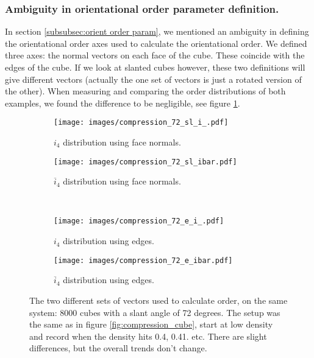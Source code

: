\documentclass[thesis]{subfiles}
\begin{document}
\subsubsection{Ambiguity in orientational order parameter definition.}\label{subsubsec:orientation vectors}
In section \ref{subsubsec:orient order param}, we mentioned an ambiguity in defining the orientational order axes used to calculate the orientational order. We defined three axes: the normal vectors on each face of the cube. These coincide with the edges of the cube. If we look at slanted cubes however, these two definitions will give different vectors (actually the one set of vectors is just a rotated version of the other). When measuring and comparing the order distributions of both examples, we found the difference to be negligible, see figure \ref{fig:orient_comparison}.

\begin{figure}[H]
	\centering
	\begin{subfigure}{0.48\textwidth}
		\centering
		\texttt{[image: images/compression\_72\_sl\_i\_.pdf]}
		\caption{$i_4$ distribution using face normals.}
	\end{subfigure}
	\begin{subfigure}{0.51\textwidth}
		\centering
		\texttt{[image: images/compression\_72\_sl\_ibar.pdf]}
		\caption{$\overline i_4$ distribution using face normals.}
	\end{subfigure}\\\vspace{10pt}
	\begin{subfigure}{0.48\textwidth}
		\centering
		\texttt{[image: images/compression\_72\_e\_i\_.pdf]}
		\caption{$i_4$ distribution using edges.}
	\end{subfigure}
	\begin{subfigure}{0.51\textwidth}
		\centering
		\texttt{[image: images/compression\_72\_e\_ibar.pdf]}
		\caption{$\overline i_4$ distribution using edges.}
	\end{subfigure}
	\caption{The two different sets of vectors used to calculate order, on the same system: 8000 cubes with a slant angle of 72 degrees. The setup was the same as in figure \ref{fig:compression_cube}, start at low density and record when the density hits 0.4, 0.41. etc. There are slight differences, but the overall trends don't change.}
	\label{fig:orient_comparison}
\end{figure}
\end{document}

